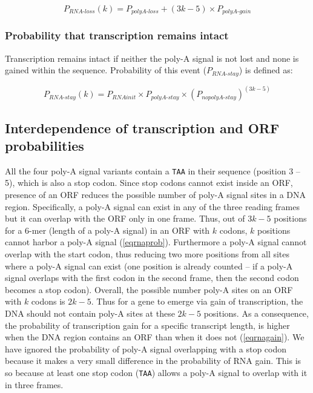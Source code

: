 \documentclass[12pt,a4paper]{article}
\begin{document}
{\begin{equation}
P_\textit{RNA-loss}(k) = P_\textit{polyA-loss} + (3k-5)\times P_\textit{polyA-gain}
\label{eqrnaloss}
\end{equation}

\subsubsection{Probability that transcription remains intact}

Transcription remains intact if neither the poly-A signal is not lost and none is gained within the sequence. Probability of this event ($P_\textit{RNA-stay}$) is defined as:

\begin{equation}
P_\textit{RNA-stay}(k) = P_\textit{RNAinit} \times P_\textit{polyA-stay} \times (P_\textit{nopolyA-stay})^{(3k-5)}
\label{eqrnastay}
\end{equation}
}
\subsection{Interdependence of transcription and ORF probabilities}

\label{rnaorfindependence}

All the four poly-A signal variants contain a \texttt{TAA} in their sequence (position 3 -- 5), which is also a stop codon. Since stop codons cannot exist inside an ORF, presence of an ORF reduces the possible number of poly-A signal sites in a DNA region. Specifically, a poly-A signal can exist in any of the three reading frames but it can overlap with the ORF only in one frame. Thus, out of $3k-5$ positions for a 6-mer (length of a poly-A signal) in an ORF with $k$ codons, $k$ positions cannot harbor a poly-A signal (\autoref{eqrnaprob}). Furthermore a poly-A signal cannot overlap with the start codon, thus reducing two more positions from all sites where a poly-A signal can exist (one position is already counted -- if a poly-A signal overlaps with the first codon in the second frame, then the second codon becomes a stop codon). Overall, the possible number poly-A sites on an ORF with $k$ codons is $2k-5$. Thus for a gene to emerge via gain of transcription, the DNA should not contain poly-A sites at these $2k-5$ positions. As a consequence, the probability of transcription gain for a specific transcript length, is higher when the DNA region contains an ORF than when it does not (\autoref{eqrnagain}). We have ignored the probability of poly-A signal overlapping with a stop codon because it makes a very small difference in the probability of RNA gain. This is so because at least one stop codon (\texttt{TAA}) allows a poly-A signal to overlap with it in three frames. 
\end{document}
